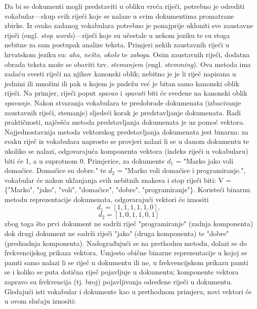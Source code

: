 \documentclass[times, utf8, zavrsni]{fer}
\begin{document}
Da bi se dokumenti mogli predstaviti u obliku vreća riječi, potrebno je odrediti vokabular—skup svih riječi koje se nalaze u svim dokumentima promatrane zbirke. Iz ovako zadanog vokabulara potrebno je ponajprije ukloniti sve zaustavne riječi (engl. \textit{stop words})—riječi koje su učestale u nekom jeziku te su stoga nebitne za sam postupak analize teksta. Primjeri nekih zaustavnih riječi u hrvatskom jeziku su: \textit{aha}, \textit{nešto}, \textit{okolo} te \textit{zaboga}. Osim zaustavnih riječi, dodatna obrada teksta može se obaviti tzv. \textit{stemanjem} (engl. \textit{stemming}). Ova metoda ima zadaću svesti riječi na njihov kanonski oblik; nebitno je je li riječ napisana u jednini ili množini ili pak u kojem je padežu već je bitan samo kanonski oblik riječi. Na primjer, riječi poput \textit{spavao} i \textit{spavati} biti će svedene na kanonski oblik \textit{spavanje}.
Nakon stvaranja vokabulara te predobrade dokumenata (izbacivanje zaustavnih riječi, stemanje) sljedeći korak je predstavljanje dokumenata. Radi praktičnosti, najčešća metoda predstavljanja dokumenata je uz pomoć vektora.
Najjednostavnija metoda vektorskog predstavljanja dokumenata jest binarna: za svaku riječ iz vokabulara naprosto se provjeri nalazi li se u danom dokumentu te ukoliko se nalazi, odgovarajuća komponenta vektora (indeks riječi u vokabularu) biti će 1, a u suprotnom 0. Primjerice, za dokumente $d_{1}$ = "Marko jako voli domaćice. Domaćice su dobre." te $d_{2}$ = "Marko voli domaćice i programiranje.", vokabular će nakon uklanjanja svih nebitnih znakova i stop riječi biti: V = \{"Marko", "jako", "voli", "domaćice", "dobre", "programiranje"\}. Koristeći binarnu metodu reprezentacije dokumenata, odgovarajući vektori će iznositi
\begin{equation}
{{d_{1}}=[1, 1, 1, 1, 1, 0]},
\end{equation}
\begin{equation}
{{d_{2}}=[1, 0, 1, 1, 0, 1]}
\end{equation}
zbog toga što prvi dokument ne sadrži riječ "programiranje" (zadnja komponenta) dok drugi dokument ne sadrži riječi "jako" (druga komponenta) te "dobre" (predzadnja komponenta).
Nadograđujući se na prethodnu metodu, dolazi se do frekvencijskog prikaza vektora. Umjesto obične binarne reprezentacije u kojoj se pamti samo nalazi li se riječ u dokumentu ili ne, u frekvencijskom prikazu pamti se i koliko se puta dotična riječ pojavljuje u dokumentu; komponente vektora zapravo su frekvencija (tj. broj) pojavljivanja određene riječi u dokumentu. Gledajući isti vokabular i dokumente kao u prethodnom primjeru, novi vektori će u ovom slučaju iznositi:
\end{document}
